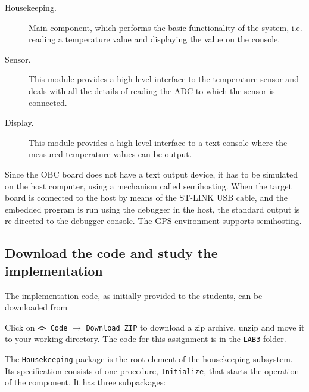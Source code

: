 \begin{description}
\item[Housekeeping.] Main component, which performs the basic functionality of the system, i.e. reading a temperature value and displaying the value on the console.
\item[Sensor.] This module provides a high-level interface to the temperature sensor and deals with all the details of reading the ADC to which the sensor is connected.
\item[Display.] This module provides a high-level interface to a text console where the measured temperature values can be output.
\end{description}

Since the OBC board does not have a text output device, it has to be simulated on the host computer, using a mechanism called semihosting. When the target board is connected to the host by means of the ST-LINK USB cable, and the embedded program is run using the debugger in the host, the standard output is re-directed to the debugger console. The GPS environment supports semihosting.

\subsection{Download the code and study the implementation}

The implementation code, as initially provided to the students, can be downloaded from

\begin{center}
	\begin{tcolorbox}[width=0.6\textwidth,
		boxsep=0pt,
		left=0pt,
		right=0pt,
		top=5pt,
		]
		\centering
	\end{tcolorbox}
\end{center}

Click on {\tt <> Code} $\rightarrow$ {\tt Download ZIP} to download a zip archive, unzip and move it to your working directory.
The code for this assignment is in the \textcolor{mPurple}{\texttt{LAB3}} folder.

The {\tt Housekeeping} package is the root element of the housekeeping subsystem. Its specification consists of one procedure, {\tt Initialize}, that starts the operation of the component. It has three subpackages:

